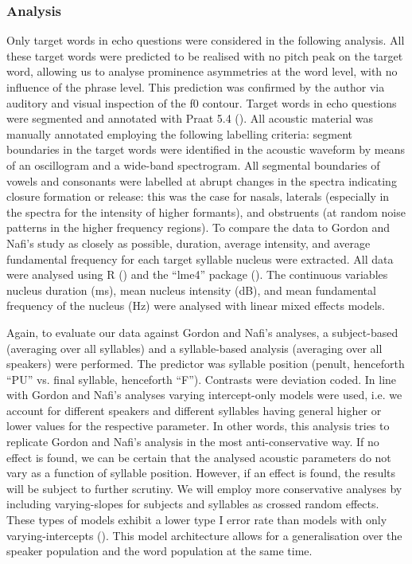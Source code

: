 \subsubsection{Analysis}
Only target words in echo questions were considered in the following analysis. All these target words were predicted to be realised with no pitch peak on the target word, allowing us to analyse prominence asymmetries at the word level, with no influence of the phrase level. This prediction was confirmed by the author via auditory and visual inspection of the f0 contour. Target words in echo questions were segmented and annotated with Praat 5.4 (\citealt{Praat2015}). All acoustic material was manually annotated employing the following labelling criteria: segment boundaries in the target words were identified in the acoustic waveform by means of an oscillogram and a wide-band spectrogram. All segmental boundaries of vowels and consonants were labelled at abrupt changes in the spectra indicating closure formation or release: this was the case for nasals, laterals (especially in the spectra for the intensity of higher formants), and obstruents (at random noise patterns in the higher frequency regions). To compare the data to Gordon and Nafi’s study as closely as possible, duration, average intensity, and average fundamental frequency for each target syllable nucleus were extracted. All data were analysed using R (\citealt{R}) and the “lme4” package (\citealt{Bates.etal2014}). The continuous variables nucleus duration (ms), mean nucleus intensity (dB), and mean fundamental frequency of the nucleus (Hz) were analysed with linear mixed effects models.

Again, to evaluate our data against Gordon and Nafi’s analyses, a subject-based (averaging over all syllables) and a syllable-based analysis (averaging over all speakers) were performed. The predictor was syllable position (penult, henceforth “PU” vs. final syllable, henceforth “F”). Contrasts were deviation coded. In line with Gordon and Nafi’s analyses varying intercept-only models were used, i.e. we account for different speakers and different syllables having general higher or lower values for the respective parameter. In other words, this analysis tries to replicate Gordon and Nafi’s analysis in the most anti-conservative way. If no effect is found, we can be certain that the analysed acoustic parameters do not vary as a function of syllable position. However, if an effect is found, the results will be subject to further scrutiny. We will employ more conservative analyses by including varying-slopes for subjects and syllables as crossed random effects. These types of models exhibit a lower type I error rate than models with only varying-intercepts (\citealt{SchielzethForstmeier2009,Barr.etal2013}). This model architecture allows for a generalisation over the speaker population and the word population at the same time.

